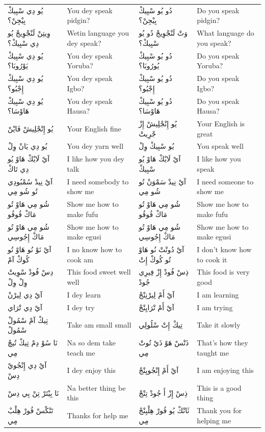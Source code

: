 \documentclass[12pt]{article}
\begin{document}
\begin{longtable}{A p{3.2cm} A p{3.2cm}}
يُو دِي سْبِيكْ بِيْجِنْ؟ & You dey speak pidgin? & دُو يُو سْبِيكْ بِيْجِنْ؟ & Do you speak pidgin? \\
وِيتِنْ لَنْجْوِيجْ يُو دِي سْبِيكْ؟ & Wetin language you dey speak? & وَتْ لَنْجْوِيجْ دُو يُو سْبِيكْ؟ & What language do you speak? \\
يُو دِي سْبِيكْ يَوْرُوبَا؟ & You dey speak Yoruba? & دُو يُو سْبِيكْ يُورُوبَا؟ & Do you speak Yoruba? \\
يُو دِي سْبِيكْ إِجْبُو؟ & You dey speak Igbo? & دُو يُو سْبِيكْ إِجْبُو؟ & Do you speak Igbo? \\
يُو دِي سْبِيكْ هَاوْسَا؟ & You dey speak Hausa? & دُو يُو سْبِيكْ هَاوْسَا؟ & Do you speak Hausa? \\
يُو إِنْجْلِيشْ فَايْنْ & Your English fine & يُو إِنْجْلِيشْ إِزْ جْرِيتْ & Your English is great \\
يُو دِي يَانْ وِلْ & You dey yarn well & يُو سْبِيكْ وِلْ & You speak well \\
آيْ لَايْكْ هَاوْ يُو دِي تَاكْ & I like how you dey talk & آيْ لَايْكْ هَاوْ يُو سْبِيكْ & I like how you speak \\
آيْ نِيدْ سُمْبُودِي تُو شُو مِي & I need somebody to show me & آيْ نِيدْ سَمْوَنْ تُو شُو مِي & I need someone to show me \\
شُو مِي هَاوْ تُو مَاكْ فُوفُو & Show me how to make fufu & شُو مِي هَاوْ تُو مَاكْ فُوفُو & Show me how to make fufu \\
شُو مِي هَاوْ تُو مَاكْ إِجُوسِي & Show me how to make egusi & شُو مِي هَاوْ تُو مَاكْ إِجُوسِي & Show me how to make egusi \\
آيْ نَوْ نُو هَاوْ تُو كُوكْ آمْ & I no know how to cook am & آيْ دُونْتْ نُو هَاوْ تُو كُوكْ إِتْ & I don’t know how to cook it \\
دِسْ فُودْ سْوِيتْ وِلْ وِلْ & This food sweet well well & ذِسْ فُودْ إِزْ فِيرِي جُودْ & This food is very good \\
آيْ دِي لِيرْنْ & I dey learn & آيْ أَمْ لِيرْنِنْجْ & I am learning \\
آيْ دِي تْرَاي & I dey try & آيْ أَمْ تْرَايِنْجْ & I am trying \\
تِيكْ آمْ سْمُولْ سْمُولْ & Take am small small & تِيكْ إِتْ سْلُولِي & Take it slowly \\
نَا سُوْ دِمْ تِيكْ تُيچْ مِي & Na so dem take teach me & ذَتْسْ هَوْ ذَيْ تُوتْ مِي & That’s how they taught me \\
آيْ دِي إِنْجُويْ دِسْ & I dey enjoy this & آيْ أَمْ إِنْجُويِنْجْ & I am enjoying this \\
نَا بِيْتَرْ تِنْ بِي دِسْ & Na better thing be this & ذِسْ إِزْ أَ جُودْ تِنْجْ & This is a good thing \\
تَنْكْسْ فُورْ هِلْبْ مِي & Thanks for help me & ثَانْكْ يُو فُورْ هِلْبِنْجْ مِي & Thank you for helping me \\

\end{longtable}
\end{document}

